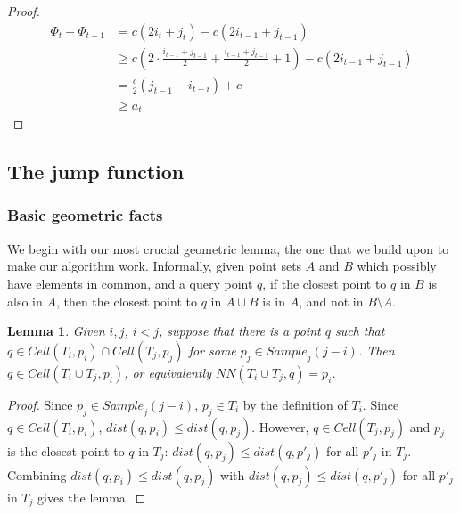\documentclass[10pt,a4paper]{amsart}
\newcommand{\Cell}{\mathit{Cell}}
\newcommand{\Sample}{\mathit{Sample}}
\newcommand{\NN}{\mathit{NN}}
\newcommand{\john}[1]{\textcolor{red}{#1}}
\newcommand{\yakov}[1]{\textcolor{blue}{Yakov: #1}}
\newtheorem{lemma}{Lemma}
\begin{document}
\begin{proof}
 \begin{align*}
 \Phi_t-\Phi_{t-1}&=  c(2i_t+j_t) - c(2i_{t-1}+j_{t-1})\\
 &\geq  c(2\cdot\frac{i_{t-1}+j_{t-1}}{2}+\frac{i_{t-1}+j_{t-1}}{2}+1) - c(2i_{t-1}+j_{t-1})
\\
&= \frac{c}{2}(j_{t-1}-i_{t-i})+c
\\ &\geq a_t
\end{align*}
\end{proof}


\subsection{The jump function}
\label{sec:jump}

\subsubsection{Basic geometric facts}

We begin with our most crucial geometric lemma, the one that we build upon to make our algorithm work. Informally, given point sets $A$ and $B$ which possibly have elements in common, and a query point $q$, if the closest point to $q$ in $B$ is also in $A$, then the closest point to $q$ in $A \cup B$ is in $A$, and not in $B \setminus A$. 

\begin{lemma}
  \label{lemma:beats1}
  Given $i,j$, $i<j$, suppose that there is a point $q$ such that $q\in \Cell(T_i,p_i)\cap \Cell(T_j,p_j)$ for some $p_j \in \Sample_j(j-i)$. Then $q \in \Cell(T_i \cup T_j,p_i)$, or equivalently $\NN(T_i \cup T_j,q)=p_i$.\\
\end{lemma}

\begin{proof}
  Since $p_j\in \Sample_j(j-i)$, $p_j\in T_i$ by the definition of $T_i$. 
  Since $q\in \Cell(T_i,p_i)$, $dist(q,p_i)\leq dist(q,p_j)$. 
  However, $q\in \Cell(T_j,p_j)$ and $p_j$ is the closest point to $q$ in $T_j$: $dist(q,p_j) \leq dist(q,p'_j)$ for all $p'_j$ in $T_j$. 
    Combining $dist(q,p_i)\leq dist(q,p_j)$ with $dist(q,p_j) \leq dist(q,p'_j)$ for all $p'_j$ in $T_j$ gives the lemma. 
\end{proof}
\end{document}
